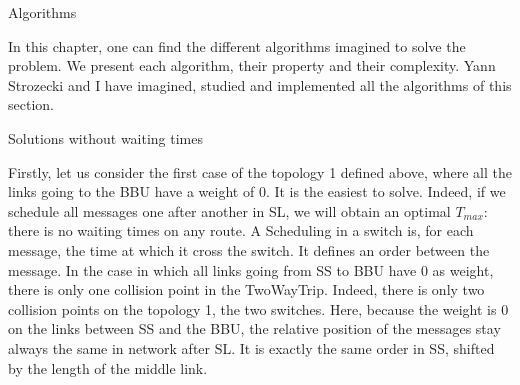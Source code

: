 \documentclass[a4paper,10pt]{report}
\begin{document}
\begin{chapter}{Algorithms}

In this chapter, one can find the different algorithms imagined to solve the problem. We present each algorithm, their property and their complexity.
Yann Strozecki and I have imagined, studied and implemented all the algorithms of this section.

\begin{section}{Solutions without waiting times}

Firstly, let us consider the first case of the topology 1 defined above, where all the links going to the BBU
have a weight of 0. It is the easiest to solve. 
Indeed, if we schedule all messages one after another in SL, we will obtain an optimal
$T_{max}$: there is no waiting times on any route.
A Scheduling in a switch is, for each message, the time at which it cross the switch. It defines an order between the message.
In the case in which all links going from SS to BBU have 0 as weight, there is only one collision point in the TwoWayTrip.
Indeed, there is only two collision points on the topology 1, the two switches. Here, because the weight is 0 on the links between SS and the BBU,
the relative position of the messages stay always the same in network after SL. It is exactly the same order in SS, shifted by the length of the middle link.\\


\end{section}
\end{chapter}
\end{document}
